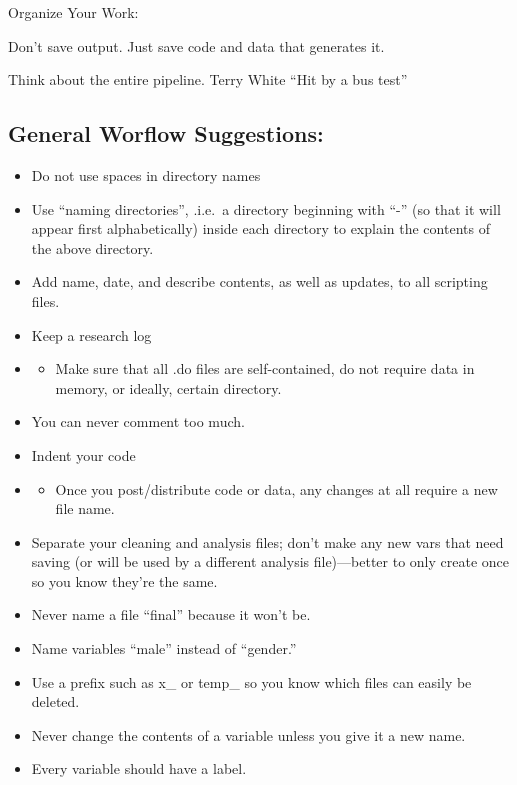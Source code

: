 \documentclass[12pt] {article}
\begin{document}
Organize Your Work:

Don't save output. Just save code and data that generates it.

Think about the entire pipeline. Terry White ``Hit by a bus test''

\subsection{General Worflow
Suggestions:}\label{general-worflow-suggestions}

\begin{itemize}
\item
  Do not use spaces in directory names
\item
  Use ``naming directories'', .i.e.~a directory beginning with ``-'' (so
  that it will appear first alphabetically) inside each directory to
  explain the contents of the above directory.
\item
  Add name, date, and describe contents, as well as updates, to all
  scripting files.
\item
  Keep a research log
\item
  \begin{itemize}
  \item
    Make sure that all .do files are self-contained, do not require data
    in memory, or ideally, certain directory.
  \end{itemize}
\item
  You can never comment too much.
\item
  Indent your code
\item
  \begin{itemize}
  \item
    Once you post/distribute code or data, any changes at all require a
    new file name.
  \end{itemize}
\item
  Separate your cleaning and analysis files; don't make any new vars
  that need saving (or will be used by a different analysis
  file)---better to only create once so you know they're the same.
\item
  Never name a file ``final'' because it won't be.
\item
  Name variables ``male'' instead of ``gender.''
\item
  Use a prefix such as x\_ or temp\_ so you know which files can easily
  be deleted.
\item
  Never change the contents of a variable unless you give it a new name.
\item
  Every variable should have a label.
\end{itemize}
\end{document}
